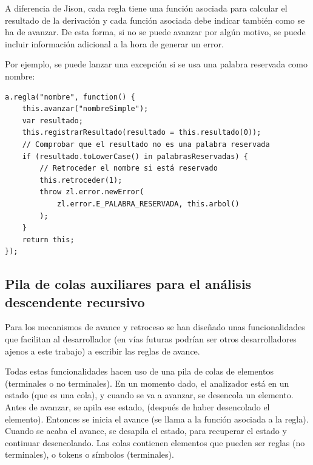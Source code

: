 \documentclass{report}
\begin{document}
	\vspace{10px}
	
	A diferencia de Jison, cada regla tiene una función asociada para calcular el resultado de la derivación y cada función asociada debe indicar también como se ha de avanzar. De esta forma, si no se puede avanzar por algún motivo, se puede incluir información adicional a la hora de generar un error. 
	

	\vspace{10px}
	
	Por ejemplo, se puede lanzar una excepción si se usa una palabra reservada como nombre: 
	
	\vspace{10px}
	
\begin{BVerbatim}
a.regla("nombre", function() {
	this.avanzar("nombreSimple");
	var resultado;
	this.registrarResultado(resultado = this.resultado(0));
	// Comprobar que el resultado no es una palabra reservada
	if (resultado.toLowerCase() in palabrasReservadas) {
		// Retroceder el nombre si está reservado
		this.retroceder(1);
		throw zl.error.newError(
			zl.error.E_PALABRA_RESERVADA, this.arbol()
		);
	}
	return this;
});
\end{BVerbatim}

	\subsection{Pila de colas auxiliares para el análisis descendente recursivo}
	
	Para los mecanismos de avance y retroceso se han diseñado unas funcionalidades que facilitan al desarrollador (en vías futuras podrían ser otros desarrolladores ajenos a este trabajo) a escribir las reglas de avance. 
	
	\vspace{10px}
	
	Todas estas funcionalidades hacen uso de una pila de colas de elementos (terminales o no terminales). En un momento dado, el analizador está en un estado (que es una cola), y cuando se va a avanzar, se desencola un elemento. Antes de avanzar, se apila ese estado, (después de haber desencolado el elemento). Entonces se inicia el avance (se llama a la función asociada a la regla). Cuando se acaba el avance, se desapila el estado, para recuperar el estado y continuar desencolando. Las colas contienen elementos que pueden ser reglas (no terminales), o tokens o símbolos (terminales).
	
\end{document}
